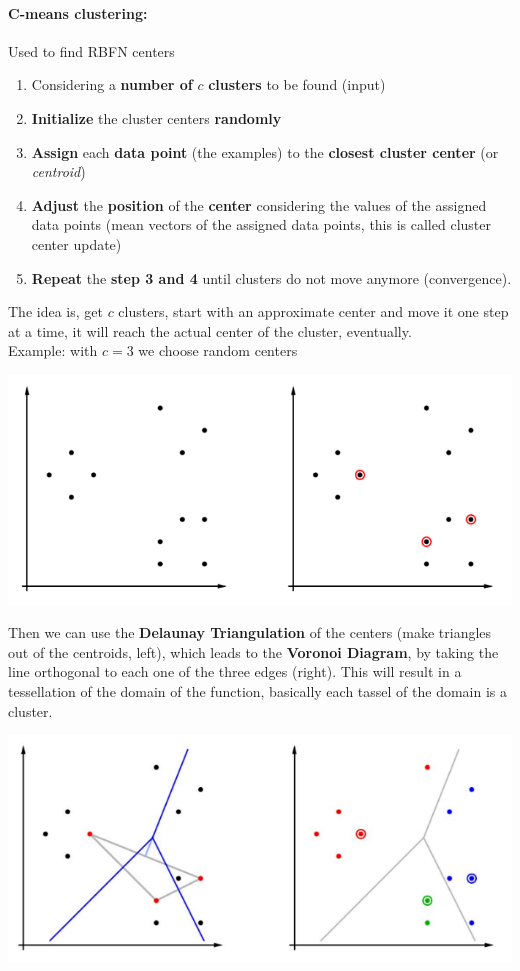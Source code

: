 \documentclass[11pt]{article}
\begin{document}
		\newpage
		
		\paragraph{C-means clustering:} Used to find RBFN centers
		\begin{enumerate}
			\item Considering a \textbf{number of} $c$ \textbf{clusters} to be found (input)
			
			\item \textbf{Initialize} the cluster centers \textbf{randomly}
			
			\item \textbf{Assign} each \textbf{data point} (the examples) to the \textbf{closest cluster center} (or \textit{centroid})
			
			\item \textbf{Adjust} the \textbf{position} of the \textbf{center} considering the values of the assigned data points (mean vectors of the assigned data points, this is called cluster center update)
			
			\item \textbf{Repeat} the \textbf{step 3 and 4} until clusters do not move anymore (convergence).
		\end{enumerate}
		The idea is, get $c$ clusters, start with an approximate center and move it one step at a time, it will reach the actual center of the cluster, eventually.\\
		
		Example: with $c=3$ we choose random centers
		\begin{center}
			\includegraphics[width=0.65\columnwidth]{img/NN/clustering1}
		\end{center}
		Then we can use the \textbf{Delaunay Triangulation} of the centers (make triangles out of the centroids, left), which leads to the \textbf{Voronoi Diagram}, by taking the line orthogonal to each one of the three edges (right). This will result in a tessellation of the domain of the function, basically each tassel of the domain is a cluster.
		\begin{center}
			\includegraphics[width=0.65\columnwidth]{img/NN/clustering2}
		\end{center}
		
\end{document}
